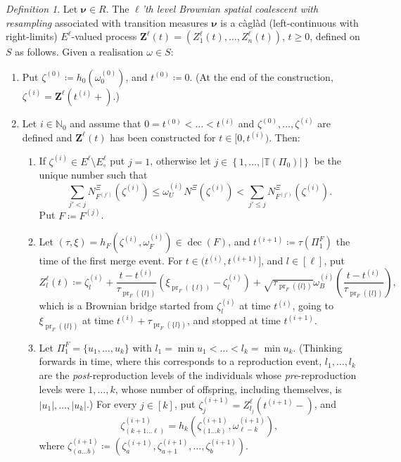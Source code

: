 \documentclass[reqno,draft]{amsart}
\numberwithin{equation}{section}
\theoremstyle{plain}
\theoremstyle{remark}
\newtheorem{definition}[theorem]{Definition}
\newcommand{\N}{\mathbb{N}} %
\DeclareMathOperator{\pr}{pr}
\newcommand{\fpart}{\Pi} %
\newcommand{\nurates}{R} %
\DeclareMathOperator{\dcb}{dec}
\begin{document}
\begin{definition}\label{def:nthlevelresampling}
    Let $\boldsymbol \nu \in \nurates$. The \emph{$\ell$'th level Brownian spatial coalescent with resampling} associated with transition measures $\boldsymbol \nu$ is a c\`agl\`ad (left-continuous with right-limits) $E^\ell$-valued process $\boldsymbol Z^\ell(t) = (Z^\ell_1(t), \ldots ,Z^\ell_n(t))$, $t\ge 0$, defined on $S$ as follows. Given a realisation $\omega \in S$:
    \begin{enumerate}
        \item Put $\zeta^{(0)} \coloneqq  h_0(\omega_0^{(0)})$, and $t^{(0)} \coloneqq  0$. (At the end of the construction, $\zeta^{(i)} = \boldsymbol Z^\ell(t^{(i)}+)$.)
        \item Let $i \in \N_0$ and assume that $0 = t ^{(0)} < \ldots < t ^{(i)}$ and $\zeta^{(0)},\ldots, \zeta^{(i)}$ are defined and $\boldsymbol Z^\ell(t)$ has been constructed for $t\in [0,t ^{(i)})$. Then:
            \begin{enumerate}
                \item[(ii.1)] If $\zeta^{(i)} \in E^\ell\setminus E^\ell_\circ $ put $j = 1$, otherwise let $j\in \left\{ 1, \ldots ,|\mathbb{T}(\fpart_0)| \right\} $ be the unique number such that \[
                    \sum_{j'< j} N^\Xi_{F^{(j')}}(\zeta^{(i)}) \le \omega_U^{(i)} N^\Xi(\zeta^{(i)}) < \sum_{j'\le j} N^\Xi_{F^{(j')}}(\zeta^{(i)}).
                \] Put $F \coloneqq F^{(j)}$.
                \item[(ii.2)] Let $(\tau,\xi) = h_F(\zeta^{(i)}, \omega_F^{(i)}) \in \dcb(F)$, and $t^{(i+1)} \coloneqq  \tau(\fpart^{F}_1)$ the time of the first merge event. For $t\in (t ^{(i)},t ^{(i+1)}]$, and $l \in [\ell]$, put
                    \begin{equation*}
                        Z^\ell_l(t) \coloneqq  \zeta^{(i)}_l + \frac{t - t ^{(i)}}{\tau_{\pr_F(\{l\})}} (\xi_{\pr_F(\left\{ l \right\} )} - \zeta^{(i)}_l) + \sqrt{\tau_{\pr_F(\{l\})}} \omega_B^{(i)}\left( \frac{t- t ^{(i)}}{\tau_{\pr_F(\{l\})}} \right),
                    \end{equation*}
                    which is a Brownian bridge started from $\zeta^{(i)}_l$ at time $t ^{(i)}$, going to $\xi_{\pr_F(\{l\})}$ at time $t ^{(i)} + \tau_{\pr_F(\{l\})}$, and stopped at time $t ^{(i+1)}$.
                \item[(ii.3)] Let $\fpart_1^F = \{u_1,\ldots,u_k\}$ with $l_1 = \min u_1 < \ldots < l_k = \min u_k$.
                (Thinking forwards in time, where this corresponds to a reproduction event, $l_1,\ldots,l_k$ are the \emph{post}-reproduction levels of the individuals whose \emph{pre}-reproduction levels were $1,\ldots, k$, whose number of offspring, including themselves, is $|u_1|,\ldots,|u_k|$.)
                For every $j\in[k]$, put $\zeta^{(i+1)}_j = Z^\ell_{l_j}(t^{(i+1)}-)$, and \[
                    \zeta^{(i+1)}_{(k+1\ldots \ell)} = h_{k}(\zeta^{(i+1)}_{(1\ldots k)},\omega^{(i+1)}_{\ell-k}),
                \]
                where $\zeta^{(i+1)}_{(a\ldots b)} \coloneqq (\zeta^{(i+1)}_a,\zeta^{(i+1)}_{a+1},\ldots,\zeta^{(i+1)}_b)$.


\end{enumerate}
\end{enumerate}
\end{definition}
\end{document}
